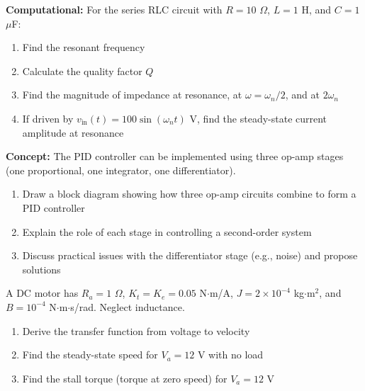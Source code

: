 \begin{exercise}
\textbf{Computational:} For the series RLC circuit with $R = 10$ $\Omega$, $L = 1$ H, and $C = 1$ $\mu$F:

\begin{enumerate}[label=(\alph*)]
    \item Find the resonant frequency
    \item Calculate the quality factor $Q$
    \item Find the magnitude of impedance at resonance, at $\omega = \omega_n/2$, and at $2\omega_n$
    \item If driven by $v_{\text{in}}(t) = 100\sin(\omega_n t)$ V, find the steady-state current amplitude at resonance
\end{enumerate}
\end{exercise}

\begin{exercise}
\textbf{Concept:} The PID controller can be implemented using three op-amp stages (one proportional, one integrator, one differentiator).

\begin{enumerate}[label=(\alph*)]
    \item Draw a block diagram showing how three op-amp circuits combine to form a PID controller
    \item Explain the role of each stage in controlling a second-order system
    \item Discuss practical issues with the differentiator stage (e.g., noise) and propose solutions
\end{enumerate}
\end{exercise}


\begin{exercise}
A DC motor has $R_a = 1$ $\Omega$, $K_t = K_e = 0.05$ N$\cdot$m/A, $J = 2 \times 10^{-4}$ kg$\cdot$m$^2$, and $B = 10^{-4}$ N$\cdot$m$\cdot$s/rad. Neglect inductance.
\begin{enumerate}[label=(\alph*)]
    \item Derive the transfer function from voltage to velocity
    \item Find the steady-state speed for $V_a = 12$ V with no load
    \item Find the stall torque (torque at zero speed) for $V_a = 12$ V
\end{enumerate}
\end{exercise}

